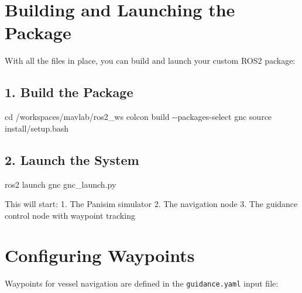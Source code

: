 \documentclass[
  letterpaper,
  DIV=11,
  numbers=noendperiod]{scrreprt}
\newenvironment{Shaded}{\begin{snugshade}}{\end{snugshade}}
\newcommand{\AttributeTok}[1]{\textcolor[rgb]{0.40,0.45,0.13}{#1}}
\newcommand{\BuiltInTok}[1]{\textcolor[rgb]{0.00,0.23,0.31}{#1}}
\newcommand{\ExtensionTok}[1]{\textcolor[rgb]{0.00,0.23,0.31}{#1}}
\newcommand{\NormalTok}[1]{\textcolor[rgb]{0.00,0.23,0.31}{#1}}
\begin{document}
\section*{Building and Launching the
Package}\label{building-and-launching-the-package}


With all the files in place, you can build and launch your custom ROS2
package:

\subsection*{1. Build the Package}\label{build-the-package}

\begin{Shaded}
\begin{Highlighting}[]
\BuiltInTok{cd}\NormalTok{ /workspaces/mavlab/ros2\_ws}
\ExtensionTok{colcon}\NormalTok{ build }\AttributeTok{{-}{-}packages{-}select}\NormalTok{ gnc}
\BuiltInTok{source}\NormalTok{ install/setup.bash}
\end{Highlighting}
\end{Shaded}

\subsection*{2. Launch the System}\label{launch-the-system}

\begin{Shaded}
\begin{Highlighting}[]
\ExtensionTok{ros2}\NormalTok{ launch gnc gnc\_launch.py}
\end{Highlighting}
\end{Shaded}

This will start: 1. The Panisim simulator 2. The navigation node 3. The
guidance control node with waypoint tracking

\section*{Configuring Waypoints}\label{configuring-waypoints}


Waypoints for vessel navigation are defined in the
\texttt{guidance.yaml} input file:
\end{document}
